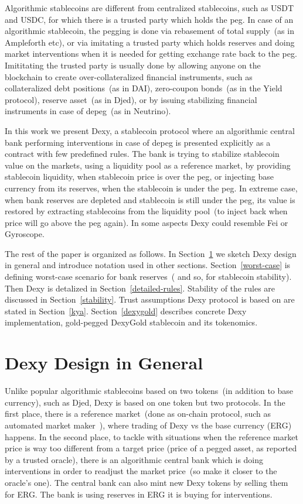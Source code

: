 \documentclass{article}   %
\newcommand{\authnote}[2]{\marginpar{\parbox{\marginparwidth}{\tiny %
  \textsf{#1 {\textcolor{blue}{notes: #2}}}}}%
  \textcolor{blue}{\textbf{\dag}}}
\newcommand{\authnote}[2]{
  \textsf{#1 \textcolor{blue}{: #2}}}
\newcommand{\authnote}[2]{}
\newcommand{\knote}[1]{{\authnote{\textcolor{green}{Alex notes}}{#1}}}
\newcommand{\bc}{ERG}
\newcommand{\dx}{Dexy}
\begin{document}
Algorithmic stablecoins are different from centralized stablecoins, such as USDT and USDC, for which there is a trusted party which holds the peg. In case of an algorithmic stablecoin, the 
pegging is done via rebasement of total supply~(as in Ampleforth etc), or via imitating a trusted party which holds reserves and doing market interventions when it is needed for getting exchange rate back to the peg. Imititating the trusted party is usually done by allowing anyone on the blockchain to create over-collateralized financial instruments, such as collateralized debt positions~(as 
in DAI), zero-coupon bonds~(as in the Yield protocol), reserve asset~(as in Djed), or by issuing stabilizing financial instruments in case of depeg~(as in Neutrino). \knote{add links to the paragraph above}

In this work we present \dx{}, a stablecoin protocol where an algorithmic central bank performing interventions in case of depeg is presented explicitly as a contract with few predefined rules. The bank is trying to stabilize stablecoin value on the markets, using a liquidity pool as a reference market, by providing stablecoin liquidity, when stablecoin price is over the peg, or injecting base currency from its reserves, when the stablecoin is under the peg. In extreme case, when bank reserves are depleted and stablecoin is still under the peg, its value is restored by extracting stablecoins from the liquidity pool~(to inject back when price will go above the peg again). In some aspects \dx{} could resemble Fei or Gyroscope. \knote{make comparison subsection}  

The rest of the paper is organized as follows.  In Section~\ref{design-general} we sketch \dx{} design in general and
introduce notation used in other sections. Section~\ref{worst-case} is defining worst-case scenario for bank reserves~(
and so, for stablecoin stability). Then \dx{} is detalized in Section~\ref{detailed-rules}. Stability of the rules are
discussed in Section~\ref{stability}. Trust assumptions \dx{} protocol is based on are stated in Section~\ref{kya}.
Section~\ref{dexygold} describes concrete \dx{} implementation, gold-pegged DexyGold stablecoin and its
tokenomics.

\section{\dx{} Design in General}
\label{design-general}

Unlike popular algorithmic stablecoins based on two tokens~(in addition to base currency), such as Djed, \dx{} is based on one token but two protocols. In the first place,
there is a reference market~(done as on-chain protocol, such as automated market maker~\cite{xu2021sok}), where trading of \dx{} vs the base currency (\bc{}) happens. In the second place, to tackle with situations when the reference market price is way too different from a target price (price of a pegged asset, as reported by a trusted oracle), there is an algorithmic central bank which is doing interventions in order to readjust the market price~(so make it closer to the oracle's one). The central bank can also mint new \dx{} tokens by selling them for \bc{}. The bank is using reserves in \bc{} it is buying for interventions. 
\end{document}
